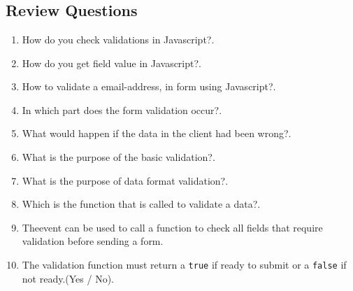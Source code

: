 \documentclass[11pt,a4paper]{article}
\begin{document}
\section*{}
\subsection*{Review Questions}
\begin{enumerate}\itemsep10pt
\item How do you check validations in Javascript?\underline{\hspace{3cm}}.
\item How do you get field value in Javascript?\underline{\hspace{3cm}}.
\item How to validate a email-address, in form using Javascript?\underline{\hspace{3cm}}.
\item In which part does the form validation occur?\underline{\hspace{3cm}}.
\item What would happen if the data in the client had been wrong?\underline{\hspace{3cm}}.
\item  What is the purpose of the basic validation?\underline{\hspace{3cm}}.
\item What is the purpose of data format validation?\underline{\hspace{3cm}}.
\item Which is the function that is called to validate a data?\underline{\hspace{3cm}}.
\item The\underline{\hspace{3cm}}event can be used to call a function to check all fields that require validation before sending a form.
\item The validation function must return a \texttt{true} if ready to submit or a \texttt{false} if not ready.(Yes / No)\underline{\hspace{3cm}}.
\end{enumerate}
\end{document}
